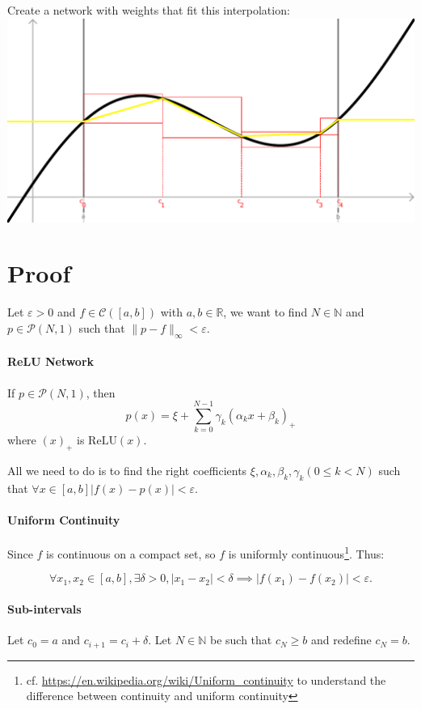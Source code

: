 \documentclass[]{article}
\begin{document}
Create a network with weights that fit this interpolation:\newline
\includegraphics[width=\linewidth]{plot_5}

\section{Proof}
Let $\varepsilon >0$ and $f \in \mathcal{C}(\left[ a,b \right])$ with $a,b \in \mathbb{R}$, we want to find $N \in \mathbb{N}$ and $p \in \mathcal{P}(N,1)$ such that $\|p-f\|_\infty < \varepsilon$.

\paragraph{ReLU Network}
If $p \in \mathcal{P}(N,1)$, then 
$$p(x) = \xi + \sum_{k=0}^{N-1} \gamma_k (\alpha_k x + \beta_k)_+$$
where $(x)_+$ is $\text{ReLU}(x)$.

All we need to do is to find the right coefficients $\xi, \alpha_k, \beta_k, \gamma_k (0 \leq k < N)$ such that $\forall x \in \left[ a,b \right] |f(x)-p(x)| < \varepsilon$.

\paragraph{Uniform Continuity}
Since $f$ is continuous on a compact set, so $f$ is uniformly continuous\footnote{cf. \url{https://en.wikipedia.org/wiki/Uniform_continuity} to understand the difference between continuity and uniform continuity}.
Thus:

$$\forall x_1,x_2 \in \left[ a,b \right], \exists \delta>0,  |x_1-x_2| < \delta \implies |f(x_1) - f(x_2)| < \varepsilon.$$

\paragraph{Sub-intervals}
Let $c_0 = a$ and $c_{i+1} = c_i + \delta$. Let $N \in \mathbb{N}$ be such that $c_N \geq b$ and redefine $c_N = b$.
\end{document}
